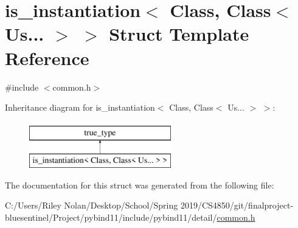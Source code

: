 \hypertarget{structis__instantiation_3_01_class_00_01_class_3_01_us_8_8_8_01_4_01_4}{}\section{is\+\_\+instantiation$<$ Class, Class$<$ Us... $>$ $>$ Struct Template Reference}
\label{structis__instantiation_3_01_class_00_01_class_3_01_us_8_8_8_01_4_01_4}


{\ttfamily \#include $<$common.\+h$>$}

Inheritance diagram for is\+\_\+instantiation$<$ Class, Class$<$ Us... $>$ $>$\+:\begin{figure}[H]
\begin{center}
\leavevmode
\includegraphics[height=2.000000cm]{structis__instantiation_3_01_class_00_01_class_3_01_us_8_8_8_01_4_01_4}
\end{center}
\end{figure}


The documentation for this struct was generated from the following file\+:\begin{DoxyCompactItemize}
\item 
C\+:/\+Users/\+Riley Nolan/\+Desktop/\+School/\+Spring 2019/\+C\+S4850/git/finalproject-\/bluesentinel/\+Project/pybind11/include/pybind11/detail/\mbox{\hyperlink{detail_2common_8h}{common.\+h}}\end{DoxyCompactItemize}
